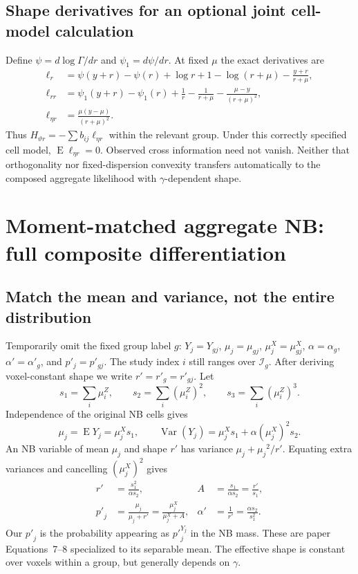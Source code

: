 \documentclass[11pt,a4paper]{article}
\newcommand{\E}{\operatorname{E}}
\newcommand{\Var}{\operatorname{Var}}
\numberwithin{equation}{section}
\begin{document}
\subsection{Shape derivatives for an optional joint cell-model calculation}
Define $\psi=d\log\Gamma/dr$ and $\psi_1=d\psi/dr$.
At fixed $\mu$ the exact derivatives are
\begin{align}
 \ell_r&=\psi(y+r)-\psi(r)+\log r+1-\log(r+\mu)-\frac{y+r}{r+\mu},\\
 \ell_{rr}&=\psi_1(y+r)-\psi_1(r)+\frac1r-\frac1{r+\mu}
                                  -\frac{\mu-y}{(r+\mu)^2},\\
 \ell_{\eta r}&=\frac{\mu(y-\mu)}{(r+\mu)^2}.
\end{align}
Thus $H_{\vartheta r}=-\sum b_{ij}\ell_{\eta r}$ within the relevant group.
Under this correctly specified cell model, $\E\ell_{\eta r}=0$.
Observed cross information need not vanish. Neither that orthogonality
nor fixed-dispersion convexity transfers automatically to the composed
aggregate likelihood with $\gamma$-dependent shape.

\section{Moment-matched aggregate NB: full composite differentiation}
\label{sec:aggregate}

\subsection{Match the mean and variance, not the entire distribution}
Temporarily omit the fixed group label $g$:
$Y_j=Y_{gj}$, $\mu_j=\mu_{gj}$, $\mu_j^X=\mu_{gj}^X$,
$\alpha=\alpha_g$, $\alpha'=\alpha'_g$, and $p'_j=p'_{gj}$.
The study index $i$ still ranges over $\mathcal I_g$.
After deriving voxel-constant shape we write $r'=r'_g=r'_{gj}$.
Let
\begin{equation}
 s_1=\sum_i \mu_i^Z,\qquad s_2=\sum_i(\mu_i^Z)^2,\qquad s_3=\sum_i(\mu_i^Z)^3.
\end{equation}
Independence of the original NB cells gives
\begin{equation}
 {\mu_j}=\E Y_j=\mu_j^Xs_1,\qquad
 \Var(Y_j)=\mu_j^Xs_1+\alpha (\mu_j^X)^2s_2 .
\end{equation}
An NB variable of mean ${\mu_j}$ and shape ${r'}$ has variance
${\mu_j}+{\mu_j}^2/{r'}$. Equating extra variances and cancelling $(\mu_j^X)^2$
gives
\begin{align}
 {r'}&=\frac{s_1^2}{\alpha s_2},&
 A&=\frac{s_1}{\alpha s_2}=\frac{{r'}}{s_1},\\
 {p'}_j&=\frac{{\mu_j}}{{\mu_j}+{r'}}=\frac{\mu_j^X}{\mu_j^X+A},&
 \alpha'&=\frac1{r'}=\frac{\alpha s_2}{s_1^2}.
 \label{eq:matched-parameters}
\end{align}
Our ${p'}_j$ is the probability appearing as ${p'}_j^{Y_j}$ in the NB mass.
These are paper Equations~7--8 specialized to its separable mean.
The effective shape is constant over voxels within a group,
but generally depends on $\gamma$.
\end{document}
